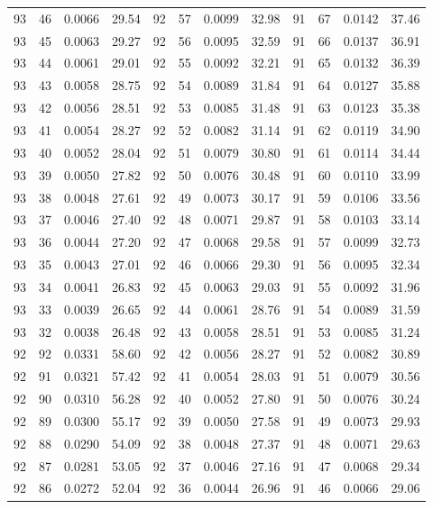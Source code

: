 \begin{tabular}{llll|llll|llll}
93 & 46 & 0.0066 & 29.54 & 92 & 57 & 0.0099 & 32.98 & 91 & 67 & 0.0142 & 37.46\\
93 & 45 & 0.0063 & 29.27 & 92 & 56 & 0.0095 & 32.59 & 91 & 66 & 0.0137 & 36.91\\
93 & 44 & 0.0061 & 29.01 & 92 & 55 & 0.0092 & 32.21 & 91 & 65 & 0.0132 & 36.39\\
93 & 43 & 0.0058 & 28.75 & 92 & 54 & 0.0089 & 31.84 & 91 & 64 & 0.0127 & 35.88\\
93 & 42 & 0.0056 & 28.51 & 92 & 53 & 0.0085 & 31.48 & 91 & 63 & 0.0123 & 35.38\\
93 & 41 & 0.0054 & 28.27 & 92 & 52 & 0.0082 & 31.14 & 91 & 62 & 0.0119 & 34.90\\
93 & 40 & 0.0052 & 28.04 & 92 & 51 & 0.0079 & 30.80 & 91 & 61 & 0.0114 & 34.44\\
93 & 39 & 0.0050 & 27.82 & 92 & 50 & 0.0076 & 30.48 & 91 & 60 & 0.0110 & 33.99\\
93 & 38 & 0.0048 & 27.61 & 92 & 49 & 0.0073 & 30.17 & 91 & 59 & 0.0106 & 33.56\\
93 & 37 & 0.0046 & 27.40 & 92 & 48 & 0.0071 & 29.87 & 91 & 58 & 0.0103 & 33.14\\
93 & 36 & 0.0044 & 27.20 & 92 & 47 & 0.0068 & 29.58 & 91 & 57 & 0.0099 & 32.73\\
93 & 35 & 0.0043 & 27.01 & 92 & 46 & 0.0066 & 29.30 & 91 & 56 & 0.0095 & 32.34\\
93 & 34 & 0.0041 & 26.83 & 92 & 45 & 0.0063 & 29.03 & 91 & 55 & 0.0092 & 31.96\\
93 & 33 & 0.0039 & 26.65 & 92 & 44 & 0.0061 & 28.76 & 91 & 54 & 0.0089 & 31.59\\
93 & 32 & 0.0038 & 26.48 & 92 & 43 & 0.0058 & 28.51 & 91 & 53 & 0.0085 & 31.24\\
92 & 92 & 0.0331 & 58.60 & 92 & 42 & 0.0056 & 28.27 & 91 & 52 & 0.0082 & 30.89\\
92 & 91 & 0.0321 & 57.42 & 92 & 41 & 0.0054 & 28.03 & 91 & 51 & 0.0079 & 30.56\\
92 & 90 & 0.0310 & 56.28 & 92 & 40 & 0.0052 & 27.80 & 91 & 50 & 0.0076 & 30.24\\
92 & 89 & 0.0300 & 55.17 & 92 & 39 & 0.0050 & 27.58 & 91 & 49 & 0.0073 & 29.93\\
92 & 88 & 0.0290 & 54.09 & 92 & 38 & 0.0048 & 27.37 & 91 & 48 & 0.0071 & 29.63\\
92 & 87 & 0.0281 & 53.05 & 92 & 37 & 0.0046 & 27.16 & 91 & 47 & 0.0068 & 29.34\\
92 & 86 & 0.0272 & 52.04 & 92 & 36 & 0.0044 & 26.96 & 91 & 46 & 0.0066 & 29.06\\

\end{tabular}
